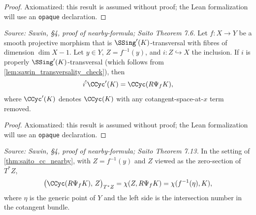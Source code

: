\begin{proof}
  Axiomatized: this result is assumed without proof; the Lean formalization will use
  an \texttt{opaque} declaration.
\end{proof}

\begin{theorem}
  \label{thm:saito_cc_nearby}
  \textit{Source: Sawin, §4, proof of nearby-formula; Saito Theorem 7.6.}
  Let $f:X\to Y$ be a smooth projective morphism that is $\SSing'(K)$-transversal
  with fibres of dimension $\dim X-1$.  Let $y\in Y$, $Z=f^{-1}(y)$, and
  $i:Z\hookrightarrow X$ the inclusion.  If $i$ is properly $\SSing'(K)$-transversal
  (which follows from \cref{lem:sawin_transversality_check}), then
  \[ i^!\CCyc'(K) = \CCyc(R\Psi_f K), \]
  where $\CCyc'(K)$ denotes $\CCyc(K)$ with any cotangent-space-at-$x$ term removed.
\end{theorem}

\begin{proof}
  Axiomatized: this result is assumed without proof; the Lean formalization will use
  an \texttt{opaque} declaration.
\end{proof}

\begin{theorem}
  \label{thm:saito_index}
  \textit{Source: Sawin, §4, proof of nearby-formula; Saito Theorem 7.13.}
  In the setting of \cref{thm:saito_cc_nearby}, with $Z=f^{-1}(y)$ and $Z$ viewed
  as the zero-section of $T^*Z$,
  \[ \bigl(\CCyc(R\Psi_f K),\, Z\bigr)_{T^*Z} = \chi(Z, R\Psi_f K) = \chi(f^{-1}(\eta), K), \]
  where $\eta$ is the generic point of $Y$ and the left side is the intersection
  number in the cotangent bundle.
\end{theorem}

